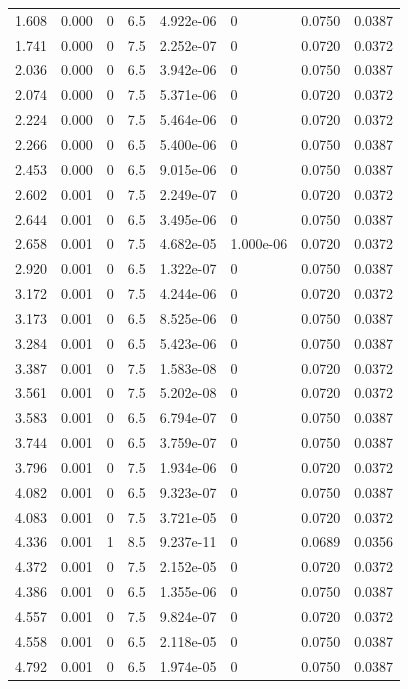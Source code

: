 \documentclass[preview]{standalone}
\begin{document}
{{\begin{tabular}{L{1.2cm}C{1.2cm} C{0.3cm}C{0.5cm} C{1.4cm}C{1.4cm} C{1.4cm}C{1.4cm}}
  1.608  &  0.000  & 0     & 6.5 &  4.922e-06  & 0  & 0.0750 &  0.0387   \\ 
  1.741  &  0.000  & 0     & 7.5 &  2.252e-07  & 0  & 0.0720 &  0.0372   \\ 
  2.036  &  0.000  & 0     & 6.5 &  3.942e-06  & 0  & 0.0750 &  0.0387   \\ 
  2.074  &  0.000  & 0     & 7.5 &  5.371e-06  & 0  & 0.0720 &  0.0372   \\ 
  2.224  &  0.000  & 0     & 7.5 &  5.464e-06  & 0  & 0.0720 &  0.0372   \\ 
  2.266  &  0.000  & 0     & 6.5 &  5.400e-06  & 0  & 0.0750 &  0.0387   \\ 
  2.453  &  0.000  & 0     & 6.5 &  9.015e-06  & 0  & 0.0750 &  0.0387   \\ 
  2.602  &  0.001  & 0     & 7.5 &  2.249e-07  & 0  & 0.0720 &  0.0372   \\ 
  2.644  &  0.001  & 0     & 6.5 &  3.495e-06  & 0  & 0.0750 &  0.0387   \\ 
  2.658  &  0.001  & 0     & 7.5 &  4.682e-05  & 1.000e-06  & 0.0720 &  0.0372   \\ 
  2.920  &  0.001  & 0     & 6.5 &  1.322e-07  & 0  & 0.0750 &  0.0387   \\ 
  3.172  &  0.001  & 0     & 7.5 &  4.244e-06  & 0  & 0.0720 &  0.0372   \\ 
  3.173  &  0.001  & 0     & 6.5 &  8.525e-06  & 0  & 0.0750 &  0.0387   \\ 
  3.284  &  0.001  & 0     & 6.5 &  5.423e-06  & 0  & 0.0750 &  0.0387   \\ 
  3.387  &  0.001  & 0     & 7.5 &  1.583e-08  & 0  & 0.0720 &  0.0372   \\ 
  3.561  &  0.001  & 0     & 7.5 &  5.202e-08  & 0  & 0.0720 &  0.0372   \\ 
  3.583  &  0.001  & 0     & 6.5 &  6.794e-07  & 0  & 0.0750 &  0.0387   \\ 
  3.744  &  0.001  & 0     & 6.5 &  3.759e-07  & 0  & 0.0750 &  0.0387   \\ 
  3.796  &  0.001  & 0     & 7.5 &  1.934e-06  & 0  & 0.0720 &  0.0372   \\ 
  4.082  &  0.001  & 0     & 6.5 &  9.323e-07  & 0  & 0.0750 &  0.0387   \\ 
  4.083  &  0.001  & 0     & 7.5 &  3.721e-05  & 0  & 0.0720 &  0.0372   \\ 
  4.336  &  0.001  & 1     & 8.5 &  9.237e-11  & 0  & 0.0689 &  0.0356   \\ 
  4.372  &  0.001  & 0     & 7.5 &  2.152e-05  & 0  & 0.0720 &  0.0372   \\ 
  4.386  &  0.001  & 0     & 6.5 &  1.355e-06  & 0  & 0.0750 &  0.0387   \\ 
  4.557  &  0.001  & 0     & 7.5 &  9.824e-07  & 0  & 0.0720 &  0.0372   \\ 
  4.558  &  0.001  & 0     & 6.5 &  2.118e-05  & 0  & 0.0750 &  0.0387   \\ 
  4.792  &  0.001  & 0     & 6.5 &  1.974e-05  & 0  & 0.0750 &  0.0387   \\ 
\hline 
\end{tabular} 

}}
\end{document}
